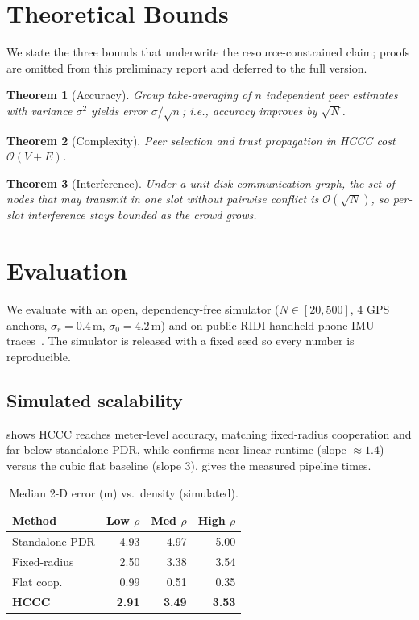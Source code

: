 \documentclass{ceurart}
\newtheorem{theorem}{Theorem}
\theoremstyle{definition}
\begin{document}
\section{Theoretical Bounds}
\label{sec:bounds}

We state the three bounds that underwrite the resource-constrained claim; proofs are
omitted from this preliminary report and deferred to the full version.

\begin{theorem}[Accuracy]\label{th:acc}
Group take-averaging of $n$ independent peer estimates with variance $\sigma^2$
yields error $\sigma/\sqrt{n}$; i.e., accuracy improves by $\sqrt{N}$.
\end{theorem}

\begin{theorem}[Complexity]\label{th:cmp}
Peer selection and trust propagation in HCCC cost $\mathcal{O}(V+E)$.
\end{theorem}

\begin{theorem}[Interference]\label{th:int}
Under a unit-disk communication graph, the set of nodes that may transmit in one slot
without pairwise conflict is $\mathcal{O}(\sqrt{N})$, so per-slot interference stays
bounded as the crowd grows.
\end{theorem}

\section{Evaluation}
\label{sec:eval}

We evaluate with an open, dependency-free simulator ($N\in[20,500]$, $4$ GPS anchors,
$\sigma_r=0.4$\,m, $\sigma_0=4.2$\,m) and on public RIDI handheld phone IMU
traces~\cite{yan2018ridi}. The simulator is released with a fixed seed so every
number is reproducible.

\subsection{Simulated scalability}
 shows HCCC reaches meter-level accuracy, matching fixed-radius
cooperation and far below standalone PDR, while  confirms near-linear
runtime (slope $\approx1.4$) versus the cubic flat baseline (slope $3$).
 gives the measured pipeline times.

\begin{table}[t]
\centering
\caption{Median 2-D error (m) vs.\ density (simulated).}
\label{tab:acc}
\begin{tabular}{lrrr}
\toprule
Method & Low $\rho$ & Med $\rho$ & High $\rho$ \\
\midrule
Standalone PDR & 4.93 & 4.97 & 5.00 \\
Fixed-radius & 2.50 & 3.38 & 3.54 \\
Flat coop. & 0.99 & 0.51 & 0.35 \\
\textbf{HCCC} & \textbf{2.91} & \textbf{3.49} & \textbf{3.53} \\
\bottomrule
\end{tabular}
\end{table}
\end{document}
